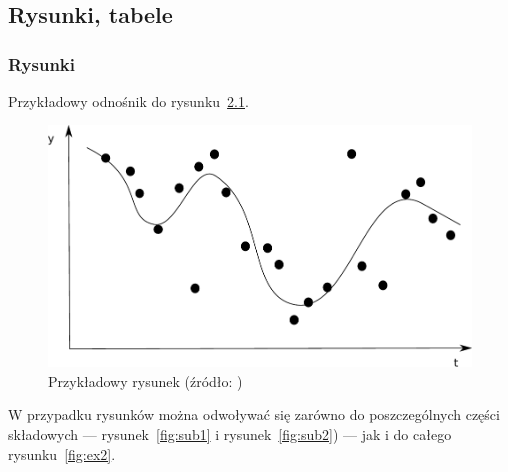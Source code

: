 \documentclass[polish]{aghengthesis}
\begin{document}
\chapter{\ChapterTitleDemoDeployment}
\label{sec:deployment}

\chapter{\ChapterTitleSummary}
\label{sec:podsumowanie}



\section{Rysunki, tabele}
\label{sec:rysunki-tabele}

\subsection{Rysunki}
\label{sec:rysunki}

Przykładowy odnośnik do rysunku~\ref{fig:ex1}.

\begin{figure}[!htbp]
  \centering
\includegraphics[width=.7\textwidth]{resources/example.pdf}
\caption[Przykładowy rysunek]{Przykładowy rysunek (źródło:
  \cite{author2021title})}
\label{fig:ex1}
\end{figure}
 
W przypadku rysunków można odwoływać się zarówno do poszczególnych części
składowych --- rysunek~\ref{fig:sub1} i rysunek~\ref{fig:sub2}) --- jak i do
całego rysunku~\ref{fig:ex2}.
\end{document}
